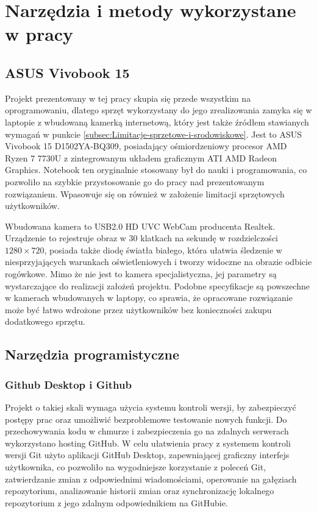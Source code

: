 \documentclass[a4paper,twoside,12pt]{book}
\begin{document}
\section{Narzędzia i metody wykorzystane w pracy}
\label{sec:Narzedzia-i-metody-wykorzystane-w-pracy}

\subsection{ASUS Vivobook 15}
\label{subsec:ASUS-Vivobook-15}

Projekt prezentowany w tej pracy skupia się przede wszystkim na oprogramowaniu, dlatego sprzęt wykorzystany do jego zrealizowania zamyka się w laptopie z wbudowaną kamerką internetową, który jest także źródłem stawianych wymagań w punkcie \ref{subsec:Limitacje-sprzetowe-i-srodowiskowe}. Jest to ASUS Vivobook 15 D1502YA-BQ309, posiadający ośmiordzeniowy procesor AMD Ryzen 7 7730U z zintegrowanym układem graficznym ATI AMD Radeon Graphics. Notebook ten oryginalnie stosowany był do nauki i programowania, co pozwoliło na szybkie przystosowanie go do pracy nad prezentowanym rozwiązaniem. Wpasowuje się on również w założenie limitacji sprzętowych użytkowników.

Wbudowana kamera to USB2.0 HD UVC WebCam producenta Realtek. Urządzenie to rejestruje obraz w 30 klatkach na sekundę w rozdzielczości $1280 \times 720$, posiada także diodę światła białego, która ułatwia śledzenie w niesprzyjających warunkach oświetleniowych i tworzy widoczne na obrazie odbicie rogówkowe. Mimo że nie jest to kamera specjalistyczna, jej parametry są wystarczające do realizacji założeń projektu. Podobne specyfikacje są powszechne w kamerach wbudowanych w laptopy, co sprawia, że opracowane rozwiązanie może być łatwo wdrożone przez użytkowników bez konieczności zakupu dodatkowego sprzętu.

\subsection{Narzędzia programistyczne}
\label{subsec:Narzedzia-programistyczne}

\subsubsection{Github Desktop i Github}

Projekt o takiej skali wymaga użycia systemu kontroli wersji, by zabezpieczyć postępy prac oraz umożliwić bezproblemowe testowanie nowych funkcji. Do przechowywania kodu w chmurze i zabezpieczenia go na zdalnych serwerach wykorzystano hosting GitHub. W celu ułatwienia pracy z systemem kontroli wersji Git użyto aplikacji GitHub Desktop, zapewniającej graficzny interfejs użytkownika, co pozwoliło na wygodniejsze korzystanie z poleceń Git, zatwierdzanie zmian z odpowiednimi wiadomościami, operowanie na gałęziach repozytorium, analizowanie historii zmian oraz synchronizację lokalnego repozytorium z jego zdalnym odpowiednikiem na GitHubie.
\end{document}
